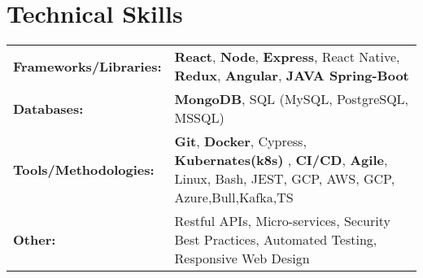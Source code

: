 \documentclass[a4paper,10pt]{article}  %
\begin{document}
\section{Technical Skills}
\begin{tabularx}{\linewidth}{@{}l X@{}}

\textbf{Frameworks/Libraries:} & \textbf{React}, \textbf{Node}, \textbf{Express}, React Native, \textbf{Redux}, \textbf{Angular}, \textbf{JAVA Spring-Boot} \\
\textbf{Databases:} & \textbf{MongoDB}, SQL (MySQL, PostgreSQL, MSSQL) \\
\textbf{Tools/Methodologies:} & \textbf{Git}, \textbf{Docker}, Cypress, \textbf{Kubernates(k8s)} , \textbf{CI/CD}, \textbf{Agile}, Linux, Bash, JEST, GCP, AWS, GCP, Azure,Bull,Kafka,TS \\ 
\textbf{Other:} & Restful APIs, Micro-services, Security Best Practices, Automated Testing, Responsive Web Design \\ 
\end{tabularx}

\vfill
\end{document}
